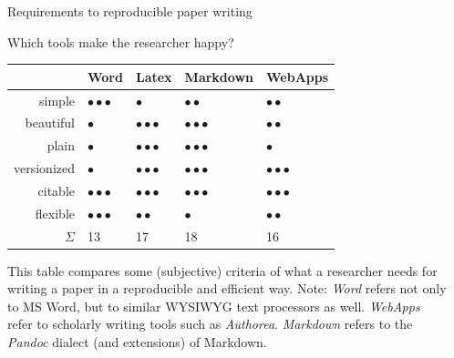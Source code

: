 \documentclass[final,hyperref={pdfpagelabels=false}]{beamer}
\begin{document}
\begin{frame}{}
\begin{columns}[t]
\begin{column}{.48\linewidth}
\begin{block}{Requirements to reproducible paper writing}
\begin{itemize}
	
       \end{itemize}
        \end{block}



   
     \begin{block}{Which tools make the researcher happy?}
    \begin{center}
\begin{tabular}{rllll}
  \hline
 & Word & Latex & Markdown & WebApps \\ 
  \hline
simple &  $\bullet\bullet\bullet$ & $\bullet$ & $\bullet\bullet$ & $\bullet\bullet$ \\ 
  beautiful & $\bullet$ & $\bullet\bullet\bullet$ & $\bullet\bullet\bullet$ &  $\bullet\bullet$ \\ 
  plain & $\bullet$ & $\bullet\bullet\bullet$ & $\bullet\bullet\bullet$ & $\bullet$ \\ 
  versionized & $\bullet$ & $\bullet\bullet\bullet$ & $\bullet\bullet\bullet$ & $\bullet\bullet\bullet$ \\ 
  citable & $\bullet\bullet\bullet$ & $\bullet\bullet\bullet$ & $\bullet\bullet\bullet$ & $\bullet\bullet\bullet$ \\ 
  flexible & $\bullet\bullet\bullet$ &  $\bullet\bullet$ & $\bullet$ &  $\bullet\bullet$ \\ 
   \hline
   $\Sigma$ & 13 & 17 & 18 & 16\\
   \hline
\end{tabular}
\end{center}
\bigskip

This table compares some (subjective) criteria of what a researcher needs for writing a paper in a reproducible and efficient way. Note: \emph{Word} refers not only to MS Word, but to similar WYSIWYG text processors as well. \emph{WebApps} refer to scholarly writing tools such as \emph{Authorea}. \emph{Markdown} refers to the \emph{Pandoc} dialect (and extensions) of Markdown.
   
        \end{block}
 
      
      \end{column}
      
            
      
      \begin{column}{.48\linewidth} 
          

\end{column}
\end{columns}
\end{frame}
\end{document}

